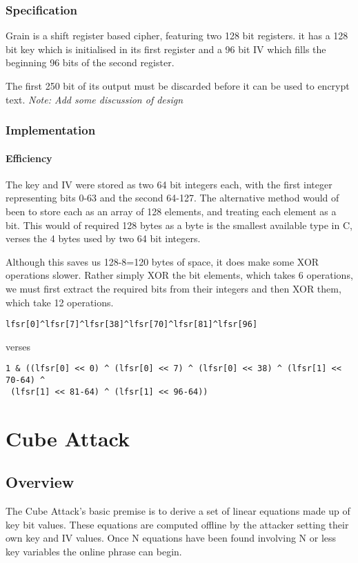 \documentclass{report}
\begin{document}
\subsection{Specification}
Grain is a shift register based cipher, featuring two 128 bit registers. it has a 128 bit key which is initialised in its first register and a 96 bit IV which fills the beginning 96 bits of the second register.

The first 250 bit of its output must be discarded before it can be used to encrypt text.
\textit{Note: Add some discussion of design}
\subsection{Implementation}
\subsubsection{Efficiency}
The key and IV were stored as two 64 bit integers each, with the first integer representing bits 0-63 and the second 64-127. The alternative method would of been to store each as an array of 128 elements, and treating each element as a bit. This would of required 128 bytes as a byte is the smallest available type in C, verses the 4 bytes used by two 64 bit integers.

Although this saves us 128-8=120 bytes of space, it does make some XOR operations slower. Rather simply XOR the bit elements, which takes 6 operations, we must first extract the required bits from their integers and then XOR them, which take 12 operations.
\begin{verbatim}
lfsr[0]^lfsr[7]^lfsr[38]^lfsr[70]^lfsr[81]^lfsr[96]
\end{verbatim}
verses
\begin{verbatim}
1 & ((lfsr[0] << 0) ^ (lfsr[0] << 7) ^ (lfsr[0] << 38) ^ (lfsr[1] << 70-64) ^
 (lfsr[1] << 81-64) ^ (lfsr[1] << 96-64))
\end{verbatim}
\chapter{Cube Attack}
\section{Overview}
The Cube Attack's basic premise is to derive a set of linear equations made up of key bit values. These equations are computed offline by the attacker setting their own key and IV values. Once N equations have been found involving N or less key variables the online phrase can begin. 
\end{document}
